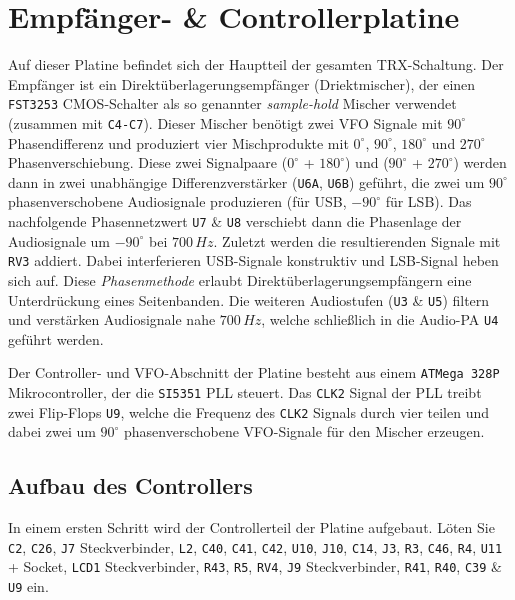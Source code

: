 \documentclass[10pt, a4paper,twoside]{scrartcl}
\begin{document}
\section{Empfänger- \& Controllerplatine} \label{sec:rx}
 Auf dieser Platine befindet sich der Hauptteil der gesamten TRX-Schaltung. Der Empfänger ist ein Direktüberlagerungsempfänger (Driektmischer), der einen \texttt{FST3253} CMOS-Schalter als so genannter \emph{sample-hold} Mischer verwendet (zusammen mit \texttt{C4-C7}). Dieser Mischer benötigt zwei VFO Signale mit $90^\circ$ Phasendifferenz und produziert vier Mischprodukte mit $0^\circ$, $90^\circ$, $180^\circ$ und $270^\circ$ Phasenverschiebung. Diese zwei Signalpaare ($0^\circ$ + $180^\circ$) und ($90^\circ$ + $270^\circ$) werden dann in zwei unabhängige Differenzverstärker (\texttt{U6A}, \texttt{U6B}) geführt, die zwei um $90^\circ$ phasenverschobene Audiosignale produzieren (für USB, $-90^\circ$ für LSB). Das nachfolgende Phasennetzwert \texttt{U7} \& \texttt{U8} verschiebt dann die Phasenlage der Audiosignale um $-90^\circ$ bei $700\,Hz$. Zuletzt werden die resultierenden Signale mit \texttt{RV3} addiert. Dabei interferieren USB-Signale konstruktiv und LSB-Signal heben sich auf. Diese \emph{Phasenmethode} erlaubt Direktüberlagerungsempfängern eine Unterdrückung eines Seitenbanden. Die weiteren Audiostufen (\texttt{U3} \& \texttt{U5}) filtern und verstärken Audiosignale nahe $700\,Hz$, welche schließlich in die Audio-PA \texttt{U4} geführt werden.
 
 Der Controller- und VFO-Abschnitt der Platine besteht aus einem \texttt{ATMega 328P} Mikrocontroller, der die \texttt{SI5351} PLL steuert. Das \texttt{CLK2} Signal der PLL treibt zwei Flip-Flops \texttt{U9}, welche die Frequenz des \texttt{CLK2} Signals durch vier teilen und dabei zwei um $90^\circ$ phasenverschobene VFO-Signale für den Mischer erzeugen.
  
\subsection{Aufbau des Controllers}
 In einem ersten Schritt wird der Controllerteil der Platine aufgebaut. Löten Sie \texttt{C2}, \texttt{C26}, \texttt{J7} Steckverbinder, \texttt{L2}, \texttt{C40}, \texttt{C41}, \texttt{C42}, \texttt{U10}, \texttt{J10}, \texttt{C14}, \texttt{J3}, \texttt{R3}, \texttt{C46}, \texttt{R4}, \texttt{U11} + Socket, \texttt{LCD1} Steckverbinder, \texttt{R43}, \texttt{R5}, \texttt{RV4}, \texttt{J9} Steckverbinder, \texttt{R41}, \texttt{R40}, \texttt{C39} \& \texttt{U9} ein. 
\end{document}
